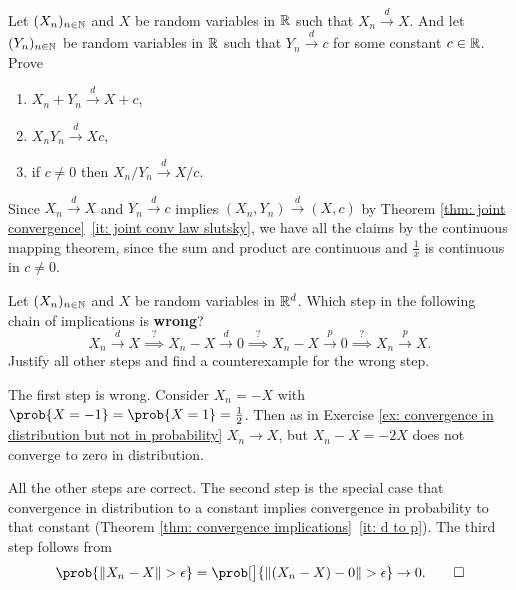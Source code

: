 \begin{exercise}
    Let \((X_n)_{n\in \mathbb{N}}\) and \(X\) be random variables in \(\mathbb{R}\)
    such that \(X_n \overset{d}\to X\). And let \((Y_n)_{n\in \mathbb{N}}\) be random
    variables in \(\mathbb{R}\) such that \(Y_n \overset{d}\to c\) for some
    constant \(c\in \mathbb{R}\). Prove
    \begin{enumerate}[label=(\alph*)]
        \item \(X_n + Y_n \overset{d}\to X + c\),
        \item \(X_n Y_n \overset{d}\to X c\),
        \item if \(c \neq 0\) then \(X_n/Y_n \overset{d}\to X/c\).
    \end{enumerate}
    \begin{solution}
        Since \(X_n \overset{d}\to X\) and \(Y_n \overset{d}\to c\) implies
        \((X_n, Y_n) \overset{d}\to (X,c)\) by Theorem \ref{thm: joint
        convergence}~\ref{it: joint conv law slutsky}, we have all the claims by
        the continuous mapping theorem, since the sum and product are continuous
        and \(\frac1x\) is continuous in \(c \neq 0\).
    \end{solution}
\end{exercise}

\begin{exercise}
    Let \((X_n)_{n\in \mathbb{N}}\) and \(X\) be random variables in \(\mathbb{R}^d\).
    Which step in the following chain of implications is \textbf{wrong}?
    \[
        X_n \overset{d}\to X
        \overset{?}\implies X_n - X \overset{d}\to 0
        \overset{?}\implies X_n - X \overset{p}\to 0
        \overset{?}\implies X_n \overset{p}\to X.
    \]
    Justify all other steps and find a counterexample for the wrong step.
    \begin{solution}
        The first step is wrong. Consider \(X_n = -X\) with
        \(\prob{X=-1}=\prob{X=1}=\frac12\). Then
        as in  Exercise \ref{ex: convergence in distribution but not in
        probability} \(X_n \to X\), but \(X_n - X = -2X\) does not converge to
        zero in distribution.

        All the other steps are correct. The second step is the special case
        that convergence in distribution to a constant implies convergence in
        probability to that constant (Theorem \ref{thm: convergence
        implications}~\ref{it: d to p}). The third step follows from 
        \[
            \prob{\norm{X_n - X} > \epsilon}
            =\prob[\big]{\norm{(X_n - X) - 0} > \epsilon}
            \to 0.
            \qedhere
        \]
    \end{solution}
\end{exercise}

